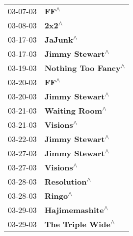 \begin{supertabular}{p{0.25\columnwidth}p{0.75\columnwidth}}
 03-07-03 &                                                                       \textbf{FF\textsuperscript{$\wedge$}} \\
 03-08-03 &                                                                      \textbf{2x2\textsuperscript{$\wedge$}} \\
 03-17-03 &                                                                   \textbf{JaJunk\textsuperscript{$\wedge$}} \\
 03-17-03 &                                                            \textbf{Jimmy Stewart\textsuperscript{$\wedge$}} \\
 03-19-03 &                                                        \textbf{Nothing Too Fancy\textsuperscript{$\wedge$}} \\
 03-20-03 &                                                                       \textbf{FF\textsuperscript{$\wedge$}} \\
 03-20-03 &                                                            \textbf{Jimmy Stewart\textsuperscript{$\wedge$}} \\
 03-21-03 &                                                             \textbf{Waiting Room\textsuperscript{$\wedge$}} \\
 03-21-03 &                                                                  \textbf{Visions\textsuperscript{$\wedge$}} \\
 03-22-03 &                                                            \textbf{Jimmy Stewart\textsuperscript{$\wedge$}} \\
 03-27-03 &                                                            \textbf{Jimmy Stewart\textsuperscript{$\wedge$}} \\
 03-27-03 &                                                                  \textbf{Visions\textsuperscript{$\wedge$}} \\
 03-28-03 &                                                               \textbf{Resolution\textsuperscript{$\wedge$}} \\
 03-28-03 &                                                                    \textbf{Ringo\textsuperscript{$\wedge$}} \\
 03-29-03 &                                                            \textbf{Hajimemashite\textsuperscript{$\wedge$}} \\
 03-29-03 &                                                          \textbf{The Triple Wide\textsuperscript{$\wedge$}} \\

\end{supertabular}
